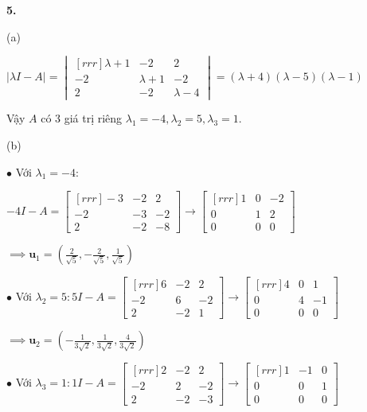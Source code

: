 \documentclass{article}
\newcommand\ddfrac[2]{\frac{\displaystyle #1}{\displaystyle #2}}
\begin{document}
    \begin{minipage}[t]{0.48\linewidth}
    \textbf{5.}

    (a) 

    $| \lambda I - A| = \begin{vmatrix}[rrr]

        \lambda + 1 & -2 & 2 \\
        -2 & \lambda  + 1 & -2 \\
        2 & -2 & \lambda  - 4 
    \end{vmatrix} = ( \lambda + 4 )( \lambda  - 5 )( \lambda  - 1 )$
    
    Vậy $A$ có 3 giá trị riêng $\lambda _1 = -4, \lambda _2 = 5, \lambda _3 = 1$.

    (b)

    $\bullet$ Với $ \lambda _1 = -4:$  

    $-4I - A = \begin{bmatrix}[rrr]
        -3 & -2 & 2 \\
        -2  & -3 & -2  \\
        2 & -2 & -8
    \end{bmatrix} \to \begin{bmatrix}[rrr]
        1 & 0 & -2 \\
        0 & 1 & 2 \\
        0 & 0 & 0 
    \end{bmatrix} $
    
    $\implies \textbf{u}_1 = \left( \ddfrac{2}{\sqrt{5}} , - \ddfrac{2}{\sqrt{5}} , \ddfrac{1}{\sqrt{5}}  \right)$

    $\bullet$ Với $ \lambda _2 = 5: 5I - A = \begin{bmatrix}[rrr]
        6 & -2 & 2 \\
        -2 & 6 & -2 \\
        2 & -2 & 1 
    \end{bmatrix} \to \begin{bmatrix}[rrr]
        4 & 0 & 1 \\
        0 & 4 & -1 \\
        0 & 0 & 0 
    \end{bmatrix} $
    
    $\implies \textbf{u}_2 = \left( - \ddfrac{1}{3\sqrt{2}} , \ddfrac{1}{3\sqrt{2}} , \ddfrac{4}{3\sqrt{2}}  \right)$

    $\bullet$ Với $ \lambda _3 = 1: 1I - A = \begin{bmatrix}[rrr]
        2 & -2 & 2 \\
        -2 & 2 & -2 \\
        2 & -2 & -3 
    \end{bmatrix} \to \begin{bmatrix}[rrr]
        1 & -1 & 0 \\
        0 & 0 & 1 \\
        0 & 0 & 0 
    \end{bmatrix} $


\end{minipage}
\end{document}
